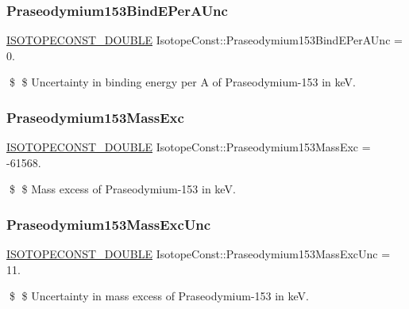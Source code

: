 \subsubsection{\texorpdfstring{Praseodymium153\+Bind\+E\+Per\+A\+Unc}{Praseodymium153BindEPerAUnc}}
{\footnotesize\ttfamily \mbox{\hyperlink{group___isotope_const-_macros_ga8f45a7272ce02c0b4c65c44636ed719a}{I\+S\+O\+T\+O\+P\+E\+C\+O\+N\+S\+T\+\_\+\+D\+O\+U\+B\+LE}} Isotope\+Const\+::\+Praseodymium153\+Bind\+E\+Per\+A\+Unc = 0.}

\$ \$ Uncertainty in binding energy per A of Praseodymium-\/153 in keV. \mbox{\label{group___isotope_const-_praseodymium-_pr153_ga3650bc283dc206c36aa958647eea56e9}} 
\subsubsection{\texorpdfstring{Praseodymium153\+Mass\+Exc}{Praseodymium153MassExc}}
{\footnotesize\ttfamily \mbox{\hyperlink{group___isotope_const-_macros_ga8f45a7272ce02c0b4c65c44636ed719a}{I\+S\+O\+T\+O\+P\+E\+C\+O\+N\+S\+T\+\_\+\+D\+O\+U\+B\+LE}} Isotope\+Const\+::\+Praseodymium153\+Mass\+Exc = -\/61568.}

\$ \$ Mass excess of Praseodymium-\/153 in keV. \mbox{\label{group___isotope_const-_praseodymium-_pr153_ga676de66a2ee9cfb7a22a2e1fcc345342}} 
\subsubsection{\texorpdfstring{Praseodymium153\+Mass\+Exc\+Unc}{Praseodymium153MassExcUnc}}
{\footnotesize\ttfamily \mbox{\hyperlink{group___isotope_const-_macros_ga8f45a7272ce02c0b4c65c44636ed719a}{I\+S\+O\+T\+O\+P\+E\+C\+O\+N\+S\+T\+\_\+\+D\+O\+U\+B\+LE}} Isotope\+Const\+::\+Praseodymium153\+Mass\+Exc\+Unc = 11.}

\$ \$ Uncertainty in mass excess of Praseodymium-\/153 in keV. \mbox{\label{group___isotope_const-_praseodymium-_pr153_gad4f99689d3ec5bb560efb1b02fde8f6d}} 
